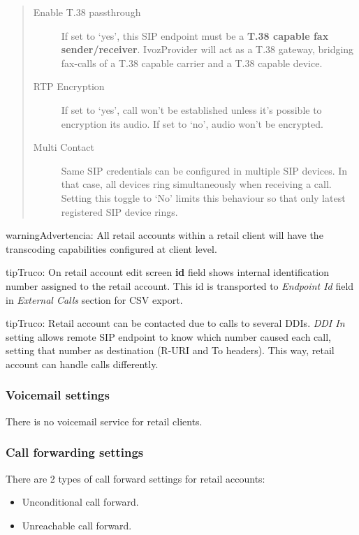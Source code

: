 \documentclass[letterpaper,10pt,spanish]{sphinxmanual}
\begin{document}
\begin{quote}
\begin{description}
\item[{Enable T.38 passthrough}] \leavevmode
If set to `yes', this SIP endpoint must be a \textbf{T.38 capable fax sender/receiver}. IvozProvider
will act as a T.38 gateway, bridging fax-calls of a T.38 capable carrier and a T.38 capable device.

\item[{RTP Encryption}] \leavevmode
If set to `yes', call won't be established unless it's possible to encryption its audio. If set to `no',
audio won't be encrypted.

\item[{Multi Contact}] \leavevmode
Same SIP credentials can be configured in multiple SIP devices. In that case, all devices ring
simultaneously when receiving a call. Setting this toggle to `No' limits this behaviour so that
only latest registered SIP device rings.

\end{description}
\end{quote}

\begin{notice}{warning}{Advertencia:}
All retail accounts within a retail client will have the transcoding capabilities configured at client level.
\end{notice}

\begin{notice}{tip}{Truco:}
On retail account edit screen \textbf{id} field shows internal identification number assigned to the retail account.
This id is transported to \emph{Endpoint Id} field in \emph{External Calls} section for CSV export.
\end{notice}

\begin{notice}{tip}{Truco:}
Retail account can be contacted due to calls to several DDIs. \emph{DDI In} setting allows remote SIP endpoint to
know which number caused each call, setting that number as destination (R-URI and To headers). This way, retail
account can handle calls differently.
\end{notice}


\subsubsection{Voicemail settings}
\label{administration_portal/client/retail/retail_accounts:voicemail-settings}
There is no voicemail service for retail clients.


\subsubsection{Call forwarding settings}
\label{administration_portal/client/retail/retail_accounts:call-forwarding-settings}
There are 2 types of call forward settings for retail accounts:
\begin{itemize}
\item {} 
Unconditional call forward.

\item {} 
Unreachable call forward.

\end{itemize}
\end{document}
